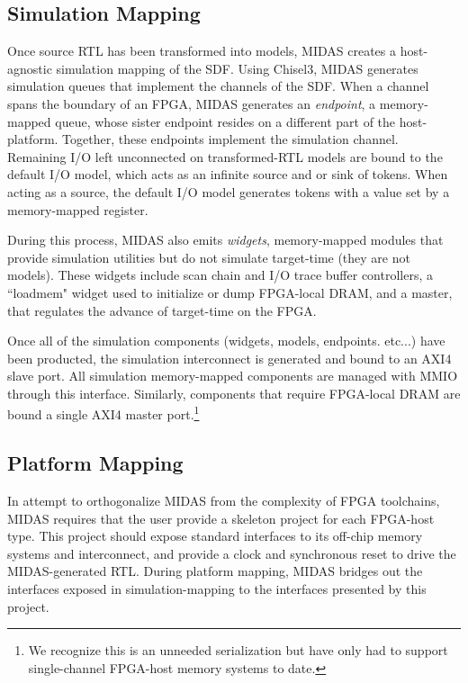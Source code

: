 \subsection{Simulation Mapping}

Once source RTL has been transformed into models, MIDAS creates a
host-agnostic simulation mapping of the SDF. Using Chisel3, MIDAS generates
simulation queues that implement the channels of the SDF. When a channel spans
the boundary of an FPGA, MIDAS generates an \emph{endpoint}, a memory-mapped
queue, whose sister endpoint resides on a different part of the host-platform.
Together, these endpoints implement the simulation channel.  Remaining I/O left
unconnected on transformed-RTL models are bound to the default I/O model, which
acts as an infinite source and or sink of tokens.  When acting as a source, the
default I/O model generates tokens with a value set by a memory-mapped register.

During this process, MIDAS also emits \emph{widgets}, memory-mapped modules
that provide simulation utilities but do not simulate target-time (they are not
models). These widgets include scan chain and I/O trace buffer controllers, a
``loadmem" widget used to initialize or dump FPGA-local DRAM, and a master,
that regulates the advance of target-time
on the FPGA.

Once all of the simulation components (widgets, models, endpoints. etc...) have
been producted, the simulation interconnect is generated and bound to an AXI4
slave port. All simulation memory-mapped components are managed with MMIO
through this interface. Similarly, components that require FPGA-local DRAM are
bound a single AXI4 master port.\footnote{We recognize this is an unneeded serialization but have only had to support single-channel FPGA-host memory systems to date.}

\subsection{Platform Mapping}

In attempt to orthogonalize MIDAS from the complexity of FPGA toolchains, MIDAS
requires that the user provide a skeleton project for each FPGA-host type. This
project should expose standard interfaces to its off-chip memory systems and
interconnect, and provide a clock and synchronous reset to drive the
MIDAS-generated RTL.  During platform mapping, MIDAS bridges out the interfaces
exposed in simulation-mapping to the interfaces presented by this project.

